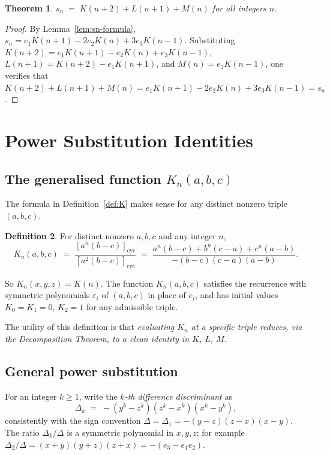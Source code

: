 \documentclass[12pt]{article}
\newtheorem{theorem}{Theorem}[section]
\theoremstyle{definition}
\newtheorem{definition}[theorem]{Definition}
\newcommand{\cyc}[1]{\left[#1\right]_{\!\mathrm{cyc}}}
\begin{document}
	\begin{theorem}
		\label{thm:sn-basis}
		$s_n \;=\; K(n+2) + L(n+1) + M(n)$ for all integers $n$.
	\end{theorem}
	\begin{proof}
		By Lemma~\ref{lem:sn-formula}, $s_n = e_1 K(n+1) - 2e_2 K(n) + 3e_3 K(n-1)$.
		Substituting $K(n+2) = e_1 K(n+1)-e_2 K(n)+e_3 K(n-1)$,
		$L(n+1) = K(n+2)-e_1 K(n+1)$, and $M(n) = e_3 K(n-1)$, one verifies
		that $K(n+2)+L(n+1)+M(n) = e_1 K(n+1) - 2e_2 K(n) + 3e_3 K(n-1) = s_n$.
	\end{proof}
	
	\section{Power Substitution Identities}
	\label{sec:substitutions}
	
	\subsection{The generalised function $K_n(a,b,c)$}
	
	The formula in Definition~\ref{def:K} makes sense for any distinct
	nonzero triple $(a,b,c)$.
	
	\begin{definition}
		\label{def:Kgen}
		For distinct nonzero $a,b,c$ and any integer $n$,
		\[
		K_n(a,b,c) \;=\; \frac{\cyc{a^n(b-c)}}{\cyc{a^2(b-c)}}
		\;=\; \frac{a^n(b-c)+b^n(c-a)+c^n(a-b)}{-(b-c)(c-a)(a-b)}.
		\]
	\end{definition}
	
	So $K_n(x,y,z) = K(n)$.  The function $K_n(a,b,c)$ satisfies the
	recurrence with symmetric polynomials $\varepsilon_i$ of $(a,b,c)$ in
	place of $e_i$, and has initial values $K_0=K_1=0$, $K_2=1$ for any
	admissible triple.
	
	The utility of this definition is that \emph{evaluating $K_n$ at a
		specific triple reduces, via the Decomposition Theorem, to a clean
		identity in $K$, $L$, $M$}.
	
	\subsection{General power substitution}
	
	For an integer $k \geq 1$, write the \emph{$k$-th difference discriminant} as
	\[
	\Delta_k \;=\; -(y^k-z^k)(z^k-x^k)(x^k-y^k),
	\]
	consistently with the sign convention $\Delta = \Delta_1 = -(y-z)(z-x)(x-y)$.
	The ratio $\Delta_k/\Delta$ is a symmetric polynomial in $x,y,z$; for
	example $\Delta_2/\Delta = (x+y)(y+z)(z+x) = -(e_3 - e_1 e_2)$.
	
\end{document}
